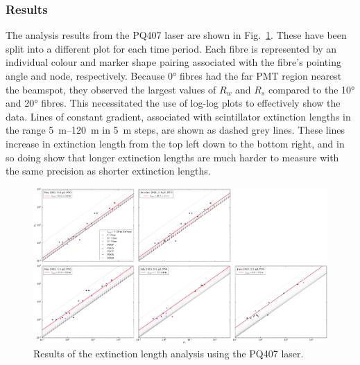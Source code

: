 \subsubsection{Results}\label{sec:smellie_ext_length_results}
The analysis results from the PQ407 laser are shown in Fig.~\ref{fig:smellie_ext_length_results_PQ407}. These have been split into a different plot for each time period. Each fibre is represented by an individual colour and marker shape pairing associated with the fibre's pointing angle and node, respectively. Because \ang{0} fibres had the far PMT region nearest the beamspot, they observed the largest values of $R_{w}$ and $R_{s}$ compared to the \ang{10} and \ang{20} fibres. This necessitated the use of log-log plots to effectively show the data. Lines of constant gradient, associated with scintillator extinction lengths in the range \SIrange{5}{120}{\m} in \SI{5}{\m} steps, are shown as dashed grey lines. These lines increase in extinction length from the top left down to the bottom right, and in so doing show that longer extinction lengths are much harder to measure with the same precision as shorter extinction lengths.

\begin{figure}
    \centering
    \includegraphics[width=\textwidth]{5_SMELLIEAnalysis/images/rsrw_plot_combined_PQ405.pdf}
    \caption[Results of the extinction length analysis using the PQ407 laser]
    {Results of the extinction length analysis using the PQ407 laser.}
    \label{fig:smellie_ext_length_results_PQ407}
\end{figure}

